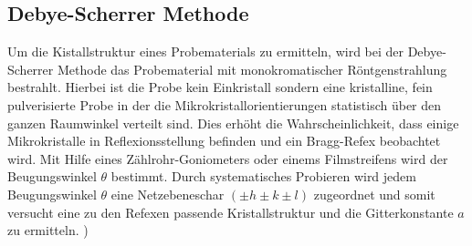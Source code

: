 \subsection{Debye-Scherrer Methode}
\label{subsec:Methoden}
Um die Kistallstruktur eines Probematerials
zu ermitteln, wird bei der Debye-Scherrer Methode
das Probematerial mit monokromatischer
Röntgenstrahlung bestrahlt.
Hierbei ist die Probe kein
Einkristall sondern eine
kristalline, fein pulverisierte Probe
in der die Mikrokristallorientierungen statistisch
über den ganzen Raumwinkel verteilt sind.
Dies erhöht die Wahrscheinlichkeit, dass
einige Mikrokristalle in Reflexionsstellung
befinden und ein Bragg-Refex beobachtet wird.
Mit Hilfe eines
Zählrohr-Goniometers oder
einems Filmstreifens wird der Beugungswinkel $\theta$
bestimmt. Durch systematisches Probieren wird
jedem Beugungswinkel $\theta$ eine Netzebeneschar
${(\pm h \pm k \pm l)}$ zugeordnet und somit versucht
eine zu den Refexen passende Kristallstruktur und
die Gitterkonstante $a$
zu ermitteln.
\cite{sample})
